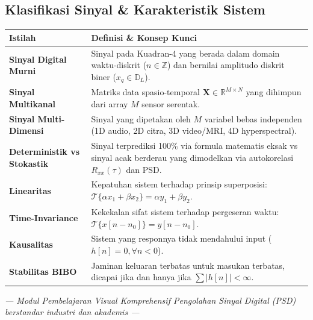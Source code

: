 \documentclass[11pt,a4paper]{article}
\begin{document}
\subsection{Klasifikasi Sinyal \& Karakteristik Sistem}
\begin{table}[h!]
\centering
\small
\begin{tabularx}{\textwidth}{l>{\raggedright\arraybackslash}X}
\toprule
\textbf{Istilah} & \textbf{Definisi \& Konsep Kunci} \\
\midrule
\textbf{Sinyal Digital Murni} & Sinyal pada Kuadran-4 yang berada dalam domain waktu-diskrit ($n \in \mathbb{Z}$) dan bernilai amplitudo diskrit biner ($x_q \in \mathbb{D}_L$). \\
\textbf{Sinyal Multikanal} & Matriks data spasio-temporal $\mathbf{X} \in \mathbb{R}^{M \times N}$ yang dihimpun dari array $M$ sensor serentak. \\
\textbf{Sinyal Multi-Dimensi} & Sinyal yang dipetakan oleh $M$ variabel bebas independen (1D audio, 2D citra, 3D video/MRI, 4D hyperspectral). \\
\textbf{Deterministik vs Stokastik} & Sinyal terprediksi 100\% via formula matematis eksak vs sinyal acak berderau yang dimodelkan via autokorelasi $R_{xx}(\tau)$ dan PSD. \\
\textbf{Linearitas} & Kepatuhan sistem terhadap prinsip superposisi: $\mathcal{T}\{\alpha x_1 + \beta x_2\} = \alpha y_1 + \beta y_2$. \\
\textbf{Time-Invariance} & Kekekalan sifat sistem terhadap pergeseran waktu: $\mathcal{T}\{x[n-n_0]\} = y[n-n_0]$. \\
\textbf{Kausalitas} & Sistem yang responnya tidak mendahului input ($h[n] = 0, \forall n < 0$). \\
\textbf{Stabilitas BIBO} & Jaminan keluaran terbatas untuk masukan terbatas, dicapai jika dan hanya jika $\sum |h[n]| < \infty$. \\
\bottomrule
\end{tabularx}
\end{table}

\vspace{0.6cm}
\begin{center}
\small\itshape\color{gray}
--- Modul Pembelajaran Visual Komprehensif Pengolahan Sinyal Digital (PSD) berstandar industri dan akademis ---
\end{center}
\end{document}
